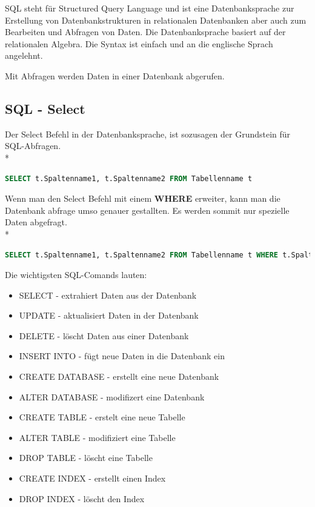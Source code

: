 SQL steht für Structured Query Language und ist eine Datenbanksprache zur Erstellung von Datenbankstrukturen in relationalen Datenbanken 
aber auch zum Bearbeiten und Abfragen von Daten. Die Datenbanksprache basiert auf der relationalen Algebra. Die Syntax ist einfach und an die englische Sprach angelehnt. 

Mit Abfragen werden Daten in einer Datenbank abgerufen. \cite{SQL}

\subsection{SQL - Select}

Der Select Befehl in der Datenbanksprache, ist sozusagen der Grundstein für SQL-Abfragen.  \\*

\begin{lstlisting}[language=SQL,caption=Sql Select,label=lst:impl:foo]
SELECT t.Spaltenname1, t.Spaltenname2 FROM Tabellenname t
\end{lstlisting}

Wenn man den Select Befehl mit einem \textbf{WHERE} erweiter, kann man die Datenbank abfrage umso genauer gestallten. Es werden sommit nur spezielle Daten abgefragt. \\*

\pagebreak

\begin{lstlisting}[language=SQL,caption=Sql Select Where,label=lst:impl:foo]
SELECT t.Spaltenname1, t.Spaltenname2 FROM Tabellenname t WHERE t.Spaltenname1 = 1
\end{lstlisting}


Die wichtigsten SQL-Comands lauten:
\begin{itemize}
  \item SELECT - extrahiert Daten aus der Datenbank
  \item UPDATE - aktualisiert Daten in der Datenbank
  \item DELETE - löscht Daten aus einer Datenbank
  \item INSERT INTO - fügt neue Daten in die Datenbank ein
  \item CREATE DATABASE - erstellt eine neue Datenbank
  \item ALTER DATABASE - modifizert eine Datenbank
  \item CREATE TABLE - erstelt eine neue Tabelle
  \item ALTER TABLE - modifiziert eine Tabelle
  \item DROP TABLE - löscht eine Tabelle
  \item CREATE INDEX - erstellt einen Index
  \item DROP INDEX - löscht den Index
\end{itemize}


